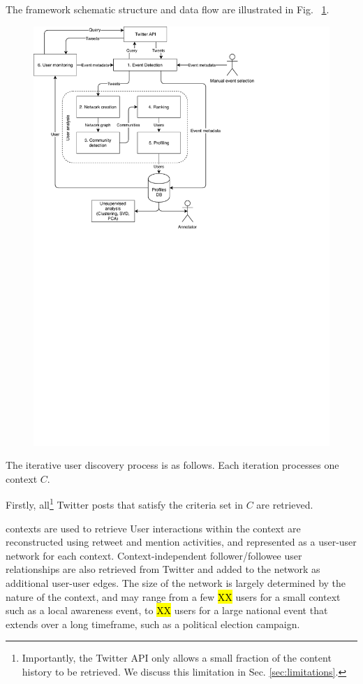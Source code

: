 \documentclass[runningheads]{llncs}
\begin{document}
The framework schematic structure and data flow are illustrated in Fig. ~\ref{fig:twitterframework}.

\begin{figure}
	\centering
	\includegraphics[width=0.7\linewidth]{figures/TwitterFramework}
	\caption{}
	\label{fig:twitterframework}
\end{figure}

The iterative user discovery process is as follows.
Each iteration processes one context $C$. 

Firstly, all\footnote{Importantly, the Twitter API only allows a small fraction of the content history to be retrieved. We discuss this limitation in Sec. \ref{sec:limitations}.}
Twitter posts that satisfy the criteria set in $C$ are retrieved.

contexts are used to retrieve 
User interactions within the context are reconstructed using retweet and mention activities, and represented as a user-user network for each context. 
%
Context-independent follower/followee user relationships are also retrieved from Twitter and added to the network as additional user-user edges.
The size of the network is largely determined by the nature of the context, and may range from a few \hl{XX} users for a small context such as a local awareness event, to \hl{XX} users for a large national event that extends over a long timeframe, such as a political election campaign.
\end{document}
